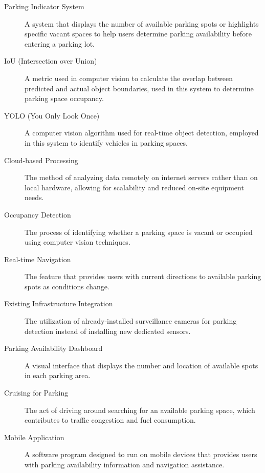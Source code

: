\begin{description}
    \item[Parking Indicator System] A system that displays the number of available parking spots or highlights specific vacant spaces to help users determine parking availability before entering a parking lot.
    
    \item[IoU (Intersection over Union)] A metric used in computer vision to calculate the overlap between predicted and actual object boundaries, used in this system to determine parking space occupancy.
    
    \item[YOLO (You Only Look Once)] A computer vision algorithm used for real-time object detection, employed in this system to identify vehicles in parking spaces.
    
    \item[Cloud-based Processing] The method of analyzing data remotely on internet servers rather than on local hardware, allowing for scalability and reduced on-site equipment needs.
    
    \item[Occupancy Detection] The process of identifying whether a parking space is vacant or occupied using computer vision techniques.
    
    \item[Real-time Navigation] The feature that provides users with current directions to available parking spots as conditions change.
    
    \item[Existing Infrastructure Integration] The utilization of already-installed surveillance cameras for parking detection instead of installing new dedicated sensors.
    
    \item[Parking Availability Dashboard] A visual interface that displays the number and location of available spots in each parking area.
    
    \item[Cruising for Parking] The act of driving around searching for an available parking space, which contributes to traffic congestion and fuel consumption.
    
    \item[Mobile Application] A software program designed to run on mobile devices that provides users with parking availability information and navigation assistance.
\end{description}